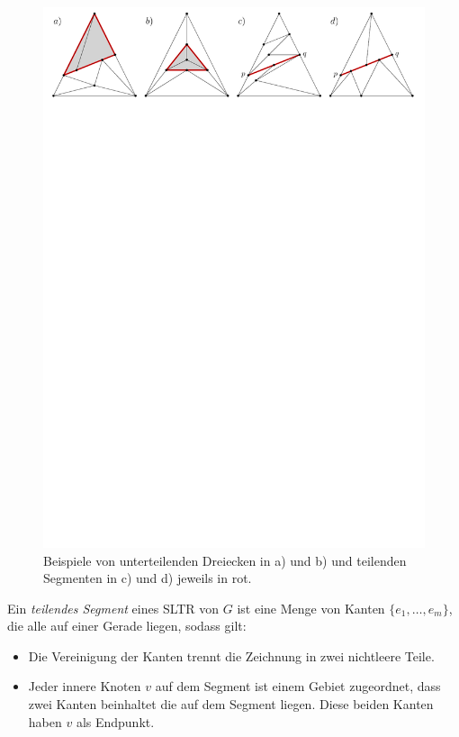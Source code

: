 \begin{figure}[b!]
	\centering
	  \includegraphics[width=1\textwidth]{subdividing_ex.pdf}
    	\caption{Beispiele von unterteilenden Dreiecken in a) und b) und teilenden Segmenten in c) und d) jeweils in rot.}
    	\label{subdividing_ex}
\end{figure}

\begin{definition}
Ein \textit{teilendes Segment} eines SLTR von $G$ ist eine Menge von Kanten $\{e_1, \ldots , e_m\}$, die alle auf einer Gerade liegen, sodass gilt:
\begin{itemize}
\item Die Vereinigung der Kanten trennt die Zeichnung in zwei nichtleere Teile. 
\item Jeder innere Knoten $v$ auf dem Segment ist einem Gebiet zugeordnet, dass zwei Kanten beinhaltet die auf dem Segment liegen. Diese beiden Kanten haben $v$ als Endpunkt.
\end{itemize}
\end{definition}

